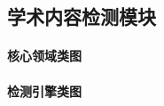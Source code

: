 \subsection{学术内容检测模块}

\paragraph*{核心领域类图}

\begin{center}
\resizebox{0.98\linewidth}{!}{}
\end{center}

\paragraph*{检测引擎类图}

\begin{center}
\resizebox{0.98\linewidth}{!}{}
\end{center}

